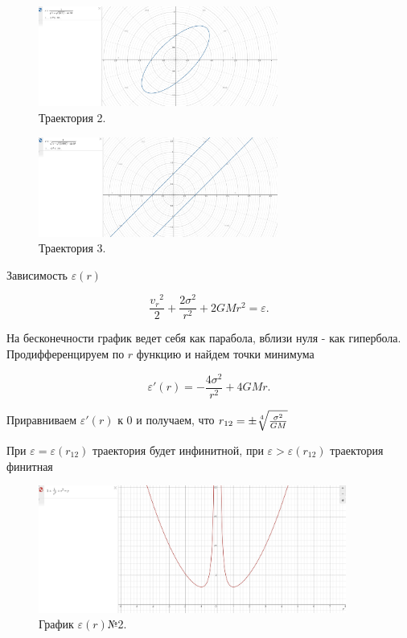 \documentclass[a4paper]{article}
\begin{document}
\begin{figure}[h]
    \centering
    \includegraphics[width=0.7\textwidth]{Graphic3_2.jpg}
    \caption{Траектория 2.}
\end{figure}
\clearpage
\begin{figure}[h]
    \centering
    \includegraphics[width=0.7\textwidth]{Graphic3_3.jpg}
    \caption{Траектория 3.}
\end{figure}

Зависимость $\varepsilon(r)$

\[
\frac{{v_{r}}^2}{2} + \frac{2\sigma^2}{r^2} + 2GMr^2 = \varepsilon.
\]

На бесконечности график ведет себя как парабола, вблизи нуля - как гипербола. Продифференцируем по $r$ функцию и найдем точки минимума

\[
\varepsilon'(r) = -\frac{4\sigma^2}{r^2} + 4GMr.
\]

Приравниваем $\varepsilon'(r)$ к 0 и получаем, что $r_{12} = \pm \sqrt[\leftroot{0}\uproot{1}4]{\frac{\sigma^2}{GM}}$

При $\varepsilon = \varepsilon(r_{12})$ траектория будет инфинитной, при $\varepsilon > \varepsilon(r_{12})$ траектория финитная


\begin{figure}[h]
    \centering
    \includegraphics[width=0.9\textwidth]{Finit2.jpg}
    \caption{График $\varepsilon(r) $№2.}
\end{figure}
\end{document}
